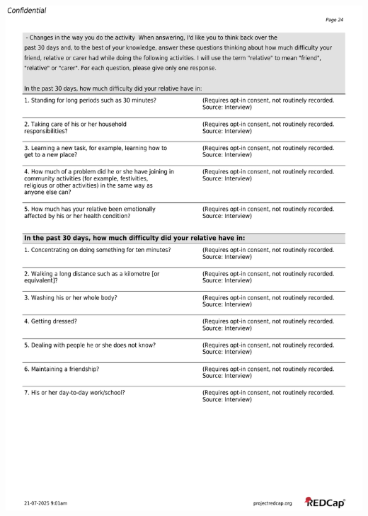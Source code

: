 \documentclass[
]{scrartcl}
\begin{document}
\includegraphics{../case-record-form/instrument-pdfs/pages/all-instruments-24.pdf}
\end{document}
